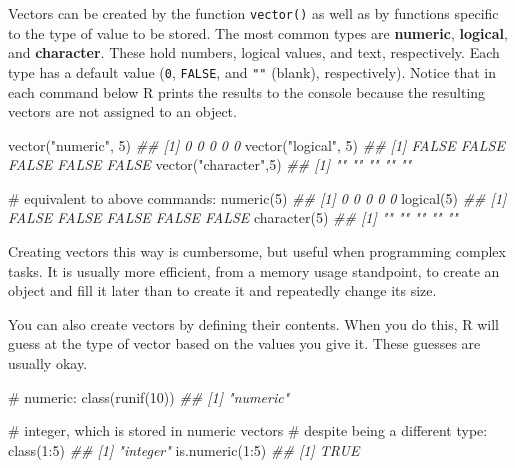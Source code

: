 \documentclass[
  13,
  letterpaper,
]{report}
\newenvironment{Shaded}{\begin{snugshade}}{\end{snugshade}}
\newcommand{\CommentTok}[1]{\textcolor[rgb]{0.37,0.37,0.37}{#1}}
\newcommand{\DecValTok}[1]{\textcolor[rgb]{0.68,0.00,0.00}{#1}}
\newcommand{\DocumentationTok}[1]{\textcolor[rgb]{0.37,0.37,0.37}{\textit{#1}}}
\newcommand{\FunctionTok}[1]{\textcolor[rgb]{0.28,0.35,0.67}{#1}}
\newcommand{\NormalTok}[1]{\textcolor[rgb]{0.00,0.23,0.31}{#1}}
\newcommand{\SpecialCharTok}[1]{\textcolor[rgb]{0.37,0.37,0.37}{#1}}
\newcommand{\StringTok}[1]{\textcolor[rgb]{0.13,0.47,0.30}{#1}}
\begin{document}
Vectors can be created by the function \texttt{vector()} as well as by
functions specific to the type of value to be stored. The most common
types are \textbf{numeric}, \textbf{logical}, and \textbf{character}.
These hold numbers, logical values, and text, respectively. Each type
has a default value (\texttt{0}, \texttt{FALSE}, and \texttt{""}
(blank), respectively). Notice that in each command below R prints the
results to the console because the resulting vectors are not assigned to
an object.

\begin{Shaded}
\begin{Highlighting}[]
\FunctionTok{vector}\NormalTok{(}\StringTok{"numeric"}\NormalTok{, }\DecValTok{5}\NormalTok{)}
\DocumentationTok{\#\# [1] 0 0 0 0 0}
\FunctionTok{vector}\NormalTok{(}\StringTok{"logical"}\NormalTok{, }\DecValTok{5}\NormalTok{)}
\DocumentationTok{\#\# [1] FALSE FALSE FALSE FALSE FALSE}
\FunctionTok{vector}\NormalTok{(}\StringTok{"character"}\NormalTok{,}\DecValTok{5}\NormalTok{)}
\DocumentationTok{\#\# [1] "" "" "" "" ""}

\CommentTok{\# equivalent to above commands:}
\FunctionTok{numeric}\NormalTok{(}\DecValTok{5}\NormalTok{)}
\DocumentationTok{\#\# [1] 0 0 0 0 0}
\FunctionTok{logical}\NormalTok{(}\DecValTok{5}\NormalTok{)}
\DocumentationTok{\#\# [1] FALSE FALSE FALSE FALSE FALSE}
\FunctionTok{character}\NormalTok{(}\DecValTok{5}\NormalTok{)}
\DocumentationTok{\#\# [1] "" "" "" "" ""}
\end{Highlighting}
\end{Shaded}

Creating vectors this way is cumbersome, but useful when programming
complex tasks. It is usually more efficient, from a memory usage
standpoint, to create an object and fill it later than to create it and
repeatedly change its size.

You can also create vectors by defining their contents. When you do
this, R will guess at the type of vector based on the values you give
it. These guesses are usually okay.

\begin{Shaded}
\begin{Highlighting}[]
\CommentTok{\# numeric:}
\FunctionTok{class}\NormalTok{(}\FunctionTok{runif}\NormalTok{(}\DecValTok{10}\NormalTok{))}
\DocumentationTok{\#\# [1] "numeric"}

\CommentTok{\# integer, which is stored in numeric vectors}
\CommentTok{\# despite being a different type:}
\FunctionTok{class}\NormalTok{(}\DecValTok{1}\SpecialCharTok{:}\DecValTok{5}\NormalTok{)}
\DocumentationTok{\#\# [1] "integer"}
\FunctionTok{is.numeric}\NormalTok{(}\DecValTok{1}\SpecialCharTok{:}\DecValTok{5}\NormalTok{)}
\DocumentationTok{\#\# [1] TRUE}
\end{Highlighting}
\end{Shaded}
\end{document}
